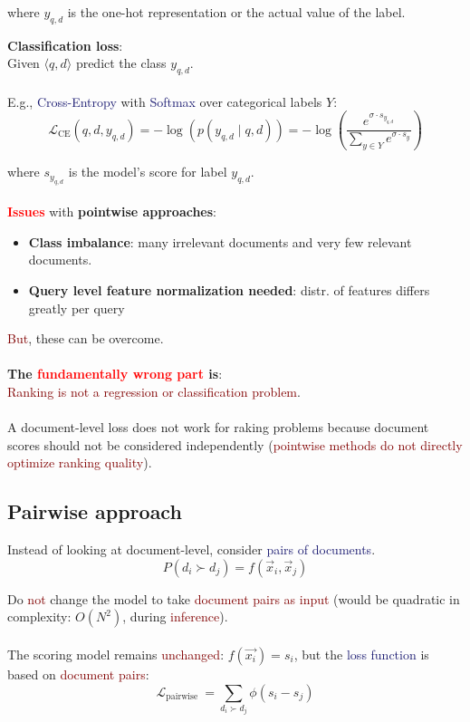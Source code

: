 where $y_{q,d}$ is the one-hot representation or the actual value of the label.

\textbf{Classification loss}: \\
Given $\langle q, d\rangle$ predict the class $y_{q,d}$. \\
\\
E.g., \textcolor{MidnightBlue}{Cross-Entropy} with \textcolor{MidnightBlue}{Softmax} over categorical labels $Y$:
$$ \mathcal{L}_{\mathrm{CE}}\left(q, d, y_{q, d}\right)=-\log \left(p\left(y_{q, d} \mid q, d\right)\right)=-\log \left(\frac{e^{\sigma \cdot s_{y_{q, d}}}}{\sum_{y \in Y} e^{\sigma \cdot s_{y}}}\right) $$

where $s_{y_{q, d}}$ is the model's score for label $y_{q,d}$.\\
\\
\textbf{\textcolor{Red}{Issues}} with \textbf{pointwise approaches}:
\begin{itemize}
\setlength\itemsep{0em}
    \item \textbf{Class imbalance}: many irrelevant documents and very few relevant documents.
    \item \textbf{Query level feature normalization needed}: distr. of features differs greatly per query
\end{itemize}

\textcolor{Maroon}{But}, these can be overcome. \\
\\

\textbf{The \textcolor{Red}{fundamentally wrong part} is}: \\
\textcolor{Maroon}{Ranking is not a regression or classification problem}. \\
\\
A document-level loss does not work for raking problems because document scores should not be considered independently (\textcolor{Maroon}{pointwise methods do not directly optimize ranking quality}). 
\subsection{Pairwise approach}
Instead of looking at document-level, consider \textcolor{MidnightBlue}{pairs of documents}. 
$$ P\left(d_{i} \succ d_{j}\right)=f\left(\vec{x}_{i}, \vec{x}_{j}\right) $$

Do \textcolor{Maroon}{not} change the model to take \textcolor{Maroon}{document pairs as input} (would be quadratic in complexity: $O\left(N^{2}\right)$, during \textcolor{Maroon}{inference}). \\
\\
The scoring model remains \textcolor{Maroon}{unchanged}: $f(\vec{x_i}) = s_i$, but the \textcolor{MidnightBlue}{loss function} is based on \textcolor{Maroon}{document pairs}:
$$ \mathcal{L}_{\text {pairwise }}=\sum_{d_{i} \succ d_{j}} \phi\left(s_{i}-s_{j}\right) $$

